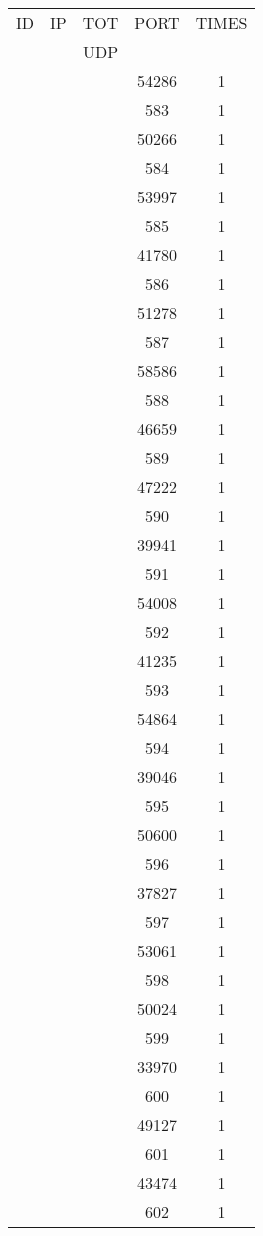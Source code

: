 \documentclass[a4paper]{scrartcl}
\begin{document}
\begin{minipage}[b]{0.5\linewidth}
\begin{tabular}{| c | c | c | c | c |}
\hline
ID & IP & TOT & PORT & TIMES \\ 
   &    & UDP &      &       \\ 
\hline
& & & 54286 & 1 \\ & & & 583 & 1 \\ & & & 50266 & 1 \\ & & & 584 & 1 \\ & & & 53997 & 1 \\ & & & 585 & 1 \\ & & & 41780 & 1 \\ & & & 586 & 1 \\ & & & 51278 & 1 \\ & & & 587 & 1 \\ & & & 58586 & 1 \\ & & & 588 & 1 \\ & & & 46659 & 1 \\ & & & 589 & 1 \\ & & & 47222 & 1 \\ & & & 590 & 1 \\ & & & 39941 & 1 \\ & & & 591 & 1 \\ & & & 54008 & 1 \\ & & & 592 & 1 \\ & & & 41235 & 1 \\ & & & 593 & 1 \\ & & & 54864 & 1 \\ & & & 594 & 1 \\ & & & 39046 & 1 \\ & & & 595 & 1 \\ & & & 50600 & 1 \\ & & & 596 & 1 \\ & & & 37827 & 1 \\ & & & 597 & 1 \\ & & & 53061 & 1 \\ & & & 598 & 1 \\ & & & 50024 & 1 \\ & & & 599 & 1 \\ & & & 33970 & 1 \\ & & & 600 & 1 \\ & & & 49127 & 1 \\ & & & 601 & 1 \\ & & & 43474 & 1 \\ & & & 602 & 1 \\ \hline\end{tabular}\end{minipage} \hfill\begin{minipage}[b]{0.5\linewidth}\begin{tabular}{| c | c | c | c | c |}

\end{tabular}
\end{minipage}
\end{document}
